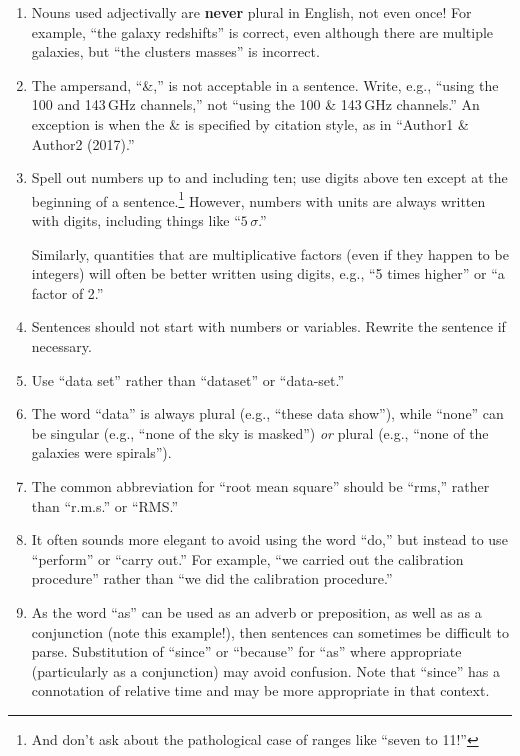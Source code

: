 \documentclass[letterpaper,11pt]{article}
\begin{document}
\begin{enumerate}
\item
Nouns used adjectivally are {\bf never\/} plural in English, not even once!
For example, ``the galaxy redshifts'' is correct, even although there are
multiple galaxies, but ``the clusters masses'' is incorrect.

\item The ampersand, ``\&,'' is not acceptable in a sentence.  Write, e.g.,
``using the 100 and 143$\,$GHz channels,'' not ``using the 100 \& 143$\,$GHz
channels.'' An exception is when the \& is specified by citation style, as in ``Author1 \& Author2 (2017).''

\item Spell out numbers up to and including ten; use digits above ten except at
the beginning of a sentence.\footnote{And don't ask about the
pathological case of ranges like ``seven to 11!''}  However, numbers with units are always written with
digits, including things like ``$5\,\sigma$.''

Similarly, quantities that are multiplicative factors (even if they happen to
be integers) will often be better written using digits, e.g., ``5 times
higher'' or ``a factor of 2.''

\item
Sentences should not start with numbers or variables.  Rewrite the sentence
if necessary.


\item
Use ``data set'' rather than ``dataset'' or ``data-set.''

\item
The word ``data'' is always plural (e.g., ``these data show''), while ``none''
can be singular (e.g., ``none of the sky is masked'') {\it or\/} plural
(e.g., ``none of the galaxies were spirals'').

\item
The common abbreviation for ``root mean square'' should be ``rms,'' rather than
``r.m.s.'' or ``RMS.''

\item
It often sounds more elegant to avoid using the word ``do,'' but instead to
use ``perform'' or ``carry out.''  For example, ``we carried out the
calibration procedure'' rather than ``we did the calibration procedure.''

\item
As the word ``as'' can be used as an adverb or preposition, as well as as a
conjunction (note this example!), then sentences can sometimes be difficult
to parse.  Substitution of ``since'' or ``because'' for ``as'' where
appropriate (particularly as a conjunction) may avoid confusion.  Note that ``since'' has a connotation
of relative time and may be more appropriate in that context.


\end{enumerate}
\end{document}
